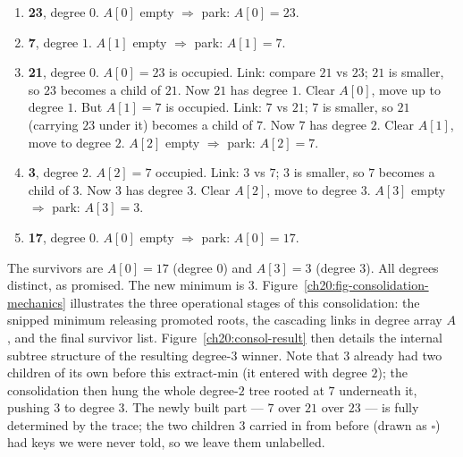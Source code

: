 \begin{enumerate}
  \item \textbf{23}, degree $0$. $A[0]$ empty $\Rightarrow$ park: $A[0]=23$.
  \item \textbf{7}, degree $1$. $A[1]$ empty $\Rightarrow$ park: $A[1]=7$.
  \item \textbf{21}, degree $0$. $A[0]=23$ is occupied. Link: compare
        $21$ vs $23$; $21$ is smaller, so $23$ becomes a child of $21$. Now $21$
        has degree $1$. Clear $A[0]$, move up to degree $1$. But $A[1]=7$ is
        occupied. Link: $7$ vs $21$; $7$ is smaller, so $21$ (carrying $23$ under
        it) becomes a child of $7$. Now $7$ has degree $2$. Clear $A[1]$, move to
        degree $2$. $A[2]$ empty $\Rightarrow$ park: $A[2]=7$.
  \item \textbf{3}, degree $2$. $A[2]=7$ occupied. Link: $3$ vs $7$; $3$ is
        smaller, so $7$ becomes a child of $3$. Now $3$ has degree $3$. Clear
        $A[2]$, move to degree $3$. $A[3]$ empty $\Rightarrow$ park: $A[3]=3$.
  \item \textbf{17}, degree $0$. $A[0]$ empty $\Rightarrow$ park: $A[0]=17$.
\end{enumerate}

The survivors are $A[0]=17$ (degree $0$) and $A[3]=3$ (degree $3$). All degrees
distinct, as promised. The new minimum is $3$. Figure~\ref{ch20:fig-consolidation-mechanics}
illustrates the three operational stages of this consolidation: the snipped minimum
releasing promoted roots, the cascading links in degree array $A$, and the final
survivor list. Figure~\ref{ch20:consol-result} then details the internal subtree
structure of the resulting degree-$3$ winner. Note that $3$ already had two children of its own
before this extract-min (it entered with degree $2$); the consolidation then hung
the whole degree-$2$ tree rooted at $7$ underneath it, pushing $3$ to degree $3$.
The newly built part --- $7$ over $21$ over $23$ --- is fully determined by the
trace; the two children $3$ carried in from before (drawn as $\square$) had keys
we were never told, so we leave them unlabelled.

